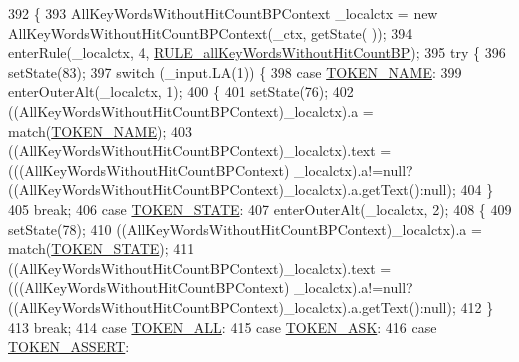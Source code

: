 \begin{DoxyCode}
392                                                                                                            
         \{
393     AllKeyWordsWithoutHitCountBPContext \_localctx = \textcolor{keyword}{new} AllKeyWordsWithoutHitCountBPContext(\_ctx, getState(
      ));
394     enterRule(\_localctx, 4, \hyperlink{classgov_1_1nasa_1_1jpf_1_1inspector_1_1client_1_1parser_1_1_console_grammar_parser_a10bfdd9072c136c09b0772579e0ad32b}{RULE\_allKeyWordsWithoutHitCountBP});
395     \textcolor{keywordflow}{try} \{
396       setState(83);
397       \textcolor{keywordflow}{switch} (\_input.LA(1)) \{
398       \textcolor{keywordflow}{case} \hyperlink{classgov_1_1nasa_1_1jpf_1_1inspector_1_1client_1_1parser_1_1_console_grammar_parser_a323fffa81e96c0bb93bfb4942b43084f}{TOKEN\_NAME}:
399         enterOuterAlt(\_localctx, 1);
400         \{
401         setState(76);
402         ((AllKeyWordsWithoutHitCountBPContext)\_localctx).a = match(\hyperlink{classgov_1_1nasa_1_1jpf_1_1inspector_1_1client_1_1parser_1_1_console_grammar_parser_a323fffa81e96c0bb93bfb4942b43084f}{TOKEN\_NAME});
403          ((AllKeyWordsWithoutHitCountBPContext)\_localctx).text =  (((AllKeyWordsWithoutHitCountBPContext)
      \_localctx).a!=null?((AllKeyWordsWithoutHitCountBPContext)\_localctx).a.getText():null); 
404         \}
405         \textcolor{keywordflow}{break};
406       \textcolor{keywordflow}{case} \hyperlink{classgov_1_1nasa_1_1jpf_1_1inspector_1_1client_1_1parser_1_1_console_grammar_parser_a1eb6e6861380a1b43846ff1627ecf06f}{TOKEN\_STATE}:
407         enterOuterAlt(\_localctx, 2);
408         \{
409         setState(78);
410         ((AllKeyWordsWithoutHitCountBPContext)\_localctx).a = match(\hyperlink{classgov_1_1nasa_1_1jpf_1_1inspector_1_1client_1_1parser_1_1_console_grammar_parser_a1eb6e6861380a1b43846ff1627ecf06f}{TOKEN\_STATE});
411          ((AllKeyWordsWithoutHitCountBPContext)\_localctx).text =  (((AllKeyWordsWithoutHitCountBPContext)
      \_localctx).a!=null?((AllKeyWordsWithoutHitCountBPContext)\_localctx).a.getText():null); 
412         \}
413         \textcolor{keywordflow}{break};
414       \textcolor{keywordflow}{case} \hyperlink{classgov_1_1nasa_1_1jpf_1_1inspector_1_1client_1_1parser_1_1_console_grammar_parser_ab726fcc8549a7dccea5cb8701b348235}{TOKEN\_ALL}:
415       \textcolor{keywordflow}{case} \hyperlink{classgov_1_1nasa_1_1jpf_1_1inspector_1_1client_1_1parser_1_1_console_grammar_parser_aceaa83591a76f17801362890ec5ace12}{TOKEN\_ASK}:
416       \textcolor{keywordflow}{case} \hyperlink{classgov_1_1nasa_1_1jpf_1_1inspector_1_1client_1_1parser_1_1_console_grammar_parser_a53439b8a59a0be879a077ffb8bb59107}{TOKEN\_ASSERT}:

\end{DoxyCode}
